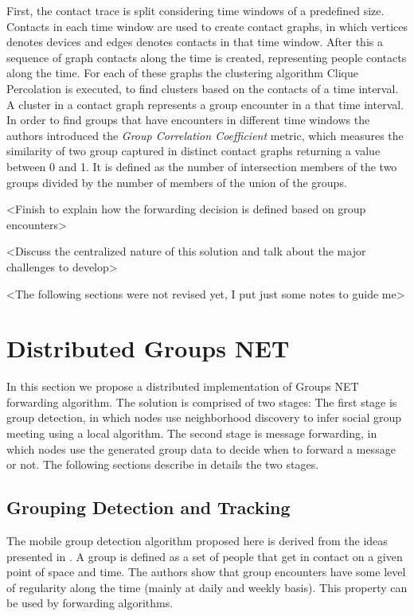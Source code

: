 First, the contact trace is split considering time windows of a predefined size. Contacts in each time window are used
to create contact graphs, in which vertices denotes devices and edges denotes contacts in that time window. After this
a sequence of graph contacts along the time is created, representing people contacts along the time. For each of these graphs
the clustering algorithm Clique Percolation \cite{derenyi2005clique} is executed, to find clusters based on the contacts of a time interval.
A cluster in a contact graph represents a group encounter in a that time interval. In order to find groups that have encounters in different time windows
the authors introduced the \textit{Group Correlation Coefficient} metric, which measures the similarity of two group captured in distinct contact graphs returning a value
between 0 and 1. It is defined as the number of intersection members of the two groups divided by the number of members of the union of the groups.

<Finish to explain how the forwarding decision is defined based on group encounters>

<Discuss the centralized nature of this solution and talk about the major challenges to develop>

<The following sections were not revised yet, I put just some notes to guide me>

\section{Distributed Groups NET}
\label{sec:distributedGroupsNET}

In this section we propose a distributed implementation of Groups NET forwarding algorithm. The solution is
comprised of two stages: The first stage is group detection, in which nodes use neighborhood discovery to
infer social group meeting using a local algorithm. The second stage is message forwarding, in which nodes
use the generated group data to decide when to forward a message or not. The following sections describe in
details the two stages.

\subsection{Grouping Detection and Tracking}
\label{subsec:groupDetection}

The mobile group detection algorithm proposed here is derived from the ideas presented in \cite{groupMobility}.
A group is defined as a set of people that get in contact on a given point of space and time. The authors show that
group encounters have some level of regularity along the time (mainly at daily and weekly basis). This property can be used by forwarding algorithms.

